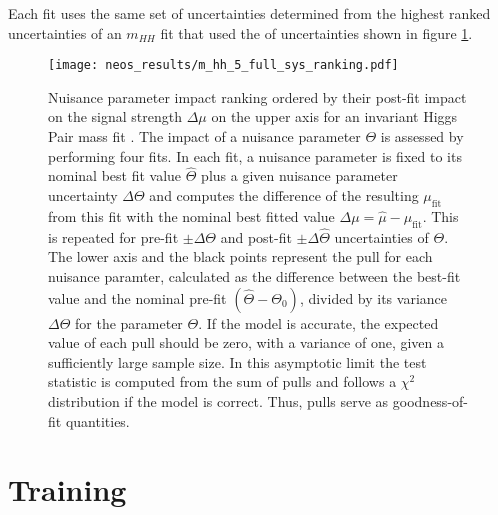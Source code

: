 Each fit uses the same set of uncertainties determined from the highest ranked uncertainties of an $m_{HH}$ fit that used the  of uncertainties shown in figure \ref{fig:m_hh_full_sys_ranking}. 
\begin{figure}
    \centering
    \texttt{[image: neos\_results/m\_hh\_5\_full\_sys\_ranking.pdf]}
    \caption[]{
        Nuisance parameter impact ranking ordered by their post-fit impact on the signal strength $\Delta\mu$ on the upper axis for an invariant Higgs Pair mass fit \mhh{}. The impact of a nuisance parameter $\Theta$ is assessed by performing four fits. In each fit, a nuisance parameter is fixed to its nominal best fit value $\hat{\Theta}$ plus a given nuisance parameter uncertainty $\Delta\Theta$ and computes the difference of the resulting $\mu_\text{fit}$ from this fit with the nominal best fitted value $\Delta\mu=\hat{\mu} - \mu_\text{fit}$. This is repeated for pre-fit $\pm\Delta\Theta$ and post-fit $\pm\Delta\hat{\Theta}$ uncertainties of $\Theta$. The lower axis and the black points represent the pull for each nuisance paramter, calculated as the difference between the best-fit value and the nominal pre-fit $(\hat{\Theta} - \Theta_0)$, divided by its variance $\Delta\Theta$ for the parameter $\Theta$. If the model is accurate, the expected value of each pull should be zero, with a variance of one, given a sufficiently large sample size. In this asymptotic limit the test statistic is computed from the sum of pulls and follows a $\chi^2$ distribution if the model is correct. Thus, pulls serve as goodness-of-fit quantities. }
    \label{fig:m_hh_full_sys_ranking}
\end{figure}

\section{Training}

